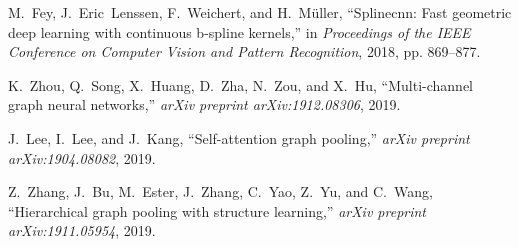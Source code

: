 \documentclass[11pt,dvipdfm]{article}
\begin{document}
\begin{thebibliography}{10}
\begin{small}
M.~Fey, J.~Eric~Lenssen, F.~Weichert, and H.~M{\"u}ller, ``Splinecnn: Fast
  geometric deep learning with continuous b-spline kernels,'' in
  \emph{Proceedings of the IEEE Conference on Computer Vision and Pattern
  Recognition}, 2018, pp. 869--877.

K.~Zhou, Q.~Song, X.~Huang, D.~Zha, N.~Zou, and X.~Hu, ``Multi-channel graph
  neural networks,'' \emph{arXiv preprint arXiv:1912.08306}, 2019.

J.~Lee, I.~Lee, and J.~Kang, ``Self-attention graph pooling,'' \emph{arXiv
  preprint arXiv:1904.08082}, 2019.

Z.~Zhang, J.~Bu, M.~Ester, J.~Zhang, C.~Yao, Z.~Yu, and C.~Wang, ``Hierarchical
  graph pooling with structure learning,'' \emph{arXiv preprint
  arXiv:1911.05954}, 2019.
\end{small}



\end{thebibliography}
\end{document}
